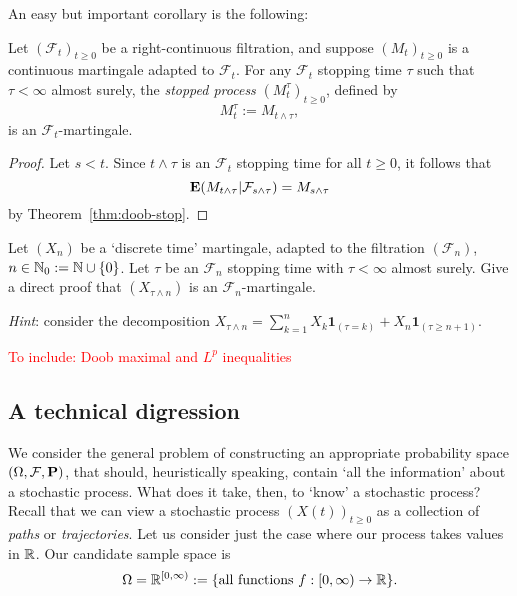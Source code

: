 An easy but important corollary is the following:
\begin{corollary}
	\label{cor:mart-is-local}
	Let $(\mathcal{F}_t)_{t \ge 0}$ be a right-continuous filtration, and suppose $(M_t)_{t\ge 0}$ is a continuous martingale adapted to $\mathcal{F}_t$. For any $\mathcal{F}_t$ stopping time $\tau$ such that $\tau<\infty$ almost surely, the \emph{stopped process} $(M^\tau_t)_{t\ge 0}$, defined by
	\begin{equation*}
		M^\tau_t := M_{t \wedge \tau},
	\end{equation*}
	is an $\mathcal{F}_t$-martingale.
\end{corollary}

\begin{proof}
	Let $s < t$. Since $t\wedge\tau$ is an $\mathcal{F}_t$ stopping time for all $t\ge 0$, it follows that
	\begin{equation*}
		\mathbf{E}(M_{t\wedge\tau} | \mathcal{F}_{s\wedge\tau}) = M_{s\wedge\tau}
	\end{equation*}
	by Theorem~\ref{thm:doob-stop}.
\end{proof}

\begin{exercise}
	Let $(X_n)$ be a `discrete time' martingale, adapted to the filtration $(\mathcal{F}_n)$, $n\in\mathbb{N}_0:=\mathbb{N}\cup\{0\}$. Let $\tau$ be an $\mathcal{F}_n$ stopping time with $\tau<\infty$ almost surely. Give a direct proof that $(X_{\tau\wedge n})$ is an $\mathcal{F}_n$-martingale.
	
	\emph{Hint}: consider the decomposition $X_{\tau\wedge n} = \sum_{k=1}^n X_k\mathbf{1}_{(\tau=k)} + X_n\mathbf{1}_{(\tau\ge n+1)}$.
\end{exercise}

\textcolor{red}{To include: Doob maximal and $L^p$ inequalities}

\subsection{A technical digression}
We consider the general problem of constructing an appropriate probability space $(\Omega,\mathcal{F},\mathbf{P})$, that should, heuristically speaking, contain `all the information' about a stochastic process. What does it take, then, to `know' a stochastic process? Recall that we can view a stochastic process $(X(t))_{t\ge 0}$ as a collection of \emph{paths} or \emph{trajectories}. Let us consider just the case where our process takes values in $\mathbb{R}$. Our candidate sample space is
\begin{equation*}
    \Omega = \mathbb{R}^{[0,\infty)} := \{ \text{all functions } f : [0, \infty) \to\mathbb{R} \}.
\end{equation*}

